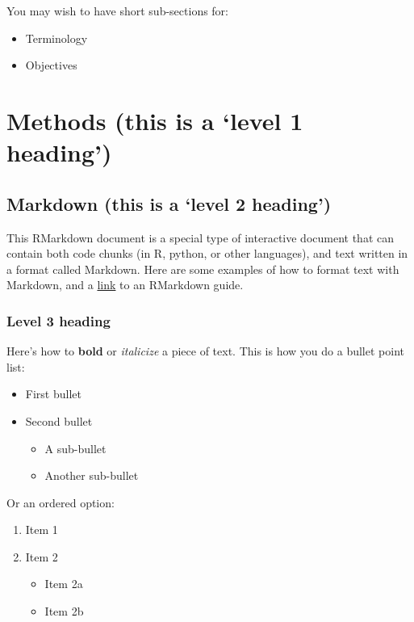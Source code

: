 \documentclass[]{elsarticle} %
\providecommand{\tightlist}{%
  \setlength{\itemsep}{0pt}\setlength{\parskip}{0pt}}
\begin{document}
You may wish to have short sub-sections for:

\begin{itemize}
\tightlist
\item
  Terminology
\item
  Objectives
\end{itemize}

\hypertarget{methods-this-is-a-level-1-heading}{%
\section{Methods (this is a `level 1 heading')}\label{methods-this-is-a-level-1-heading}}

\hypertarget{markdown-this-is-a-level-2-heading}{%
\subsection{Markdown (this is a `level 2 heading')}\label{markdown-this-is-a-level-2-heading}}

This RMarkdown document is a special type of interactive document that can contain both code chunks (in R, python, or other languages), and text written in a format called Markdown. Here are some examples of how to format text with Markdown, and a \href{https://www.rstudio.com/wp-content/uploads/2015/03/rmarkdown-reference.pdf}{link} to an RMarkdown guide.

\hypertarget{level-3-heading}{%
\subsubsection{Level 3 heading}\label{level-3-heading}}

Here's how to \textbf{bold} or \emph{italicize} a piece of text. This is how you do a bullet point list:

\begin{itemize}
\tightlist
\item
  First bullet
\item
  Second bullet

  \begin{itemize}
  \tightlist
  \item
    A sub-bullet
  \item
    Another sub-bullet
  \end{itemize}
\end{itemize}

Or an ordered option:

\begin{enumerate}
\def\labelenumi{\arabic{enumi}.}
\tightlist
\item
  Item 1
\item
  Item 2

  \begin{itemize}
  \tightlist
  \item
    Item 2a
  \item
    Item 2b
  \end{itemize}
\end{enumerate}
\end{document}
